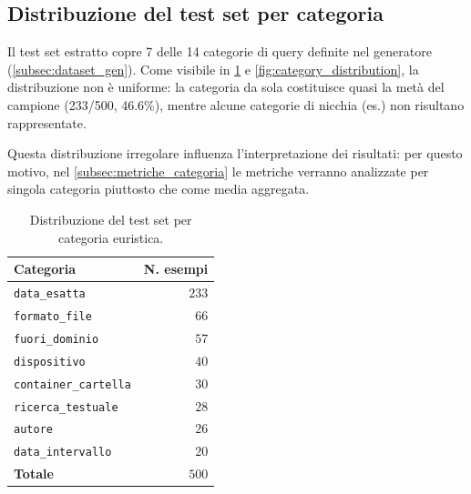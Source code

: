 \newpage
\subsection{Distribuzione del test set per categoria}\label{subsec:distribuzione_test}

\vspace{0.5em}

Il test set estratto copre 7 delle 14 categorie di query definite nel generatore (\cref{subsec:dataset_gen}). Come visibile in \cref{tab:distribuzione_test} e \cref{fig:category_distribution}, la distribuzione non è uniforme: la categoria  da sola costituisce quasi la metà del campione (233/500, 46.6\%), mentre alcune categorie di nicchia (es.\@ {}) non risultano rappresentate. 

Questa distribuzione irregolare influenza l'interpretazione dei risultati: per questo motivo, nel \cref{subsec:metriche_categoria} le metriche verranno analizzate per singola categoria piuttosto che come media aggregata.

\begin{table}[htbp]
    \centering
    \begin{tabularx}{0.85\textwidth}{X r}
    \toprule
    Categoria          & N. esempi  \\
    \midrule
    \texttt{data\_esatta}        & $233$         \\
    \texttt{formato\_file}       & $66$          \\
    \texttt{fuori\_dominio}      & $57$          \\
    \texttt{dispositivo}         & $40$          \\
    \texttt{container\_cartella} & $30$          \\
    \texttt{ricerca\_testuale}   & $28$          \\
    \texttt{autore}              & $26$          \\
    \texttt{data\_intervallo}    & $20$          \\
    \midrule
    \textbf{Totale}    & \textbf{$500$}\\
    \bottomrule
    \end{tabularx}
    \caption{Distribuzione del test set per categoria euristica.}\label{tab:distribuzione_test}
\end{table}

